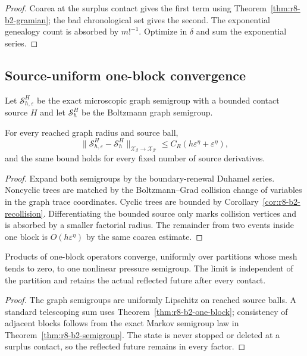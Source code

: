 \begin{proof}
Coarea at the surplus contact gives the first term using
Theorem~\ref{thm:r8-b2-gramian}; the bad chronological set gives the second.
The exponential genealogy count is absorbed by $m!^{-1}$.  Optimize in
$\delta$ and sum the exponential series.
\end{proof}

\subsection{Source-uniform one-block convergence}

Let $\mathcal S_{h,\varepsilon}^H$ be the exact microscopic graph semigroup with
a bounded contact source $H$ and let $\mathcal S_h^H$ be the Boltzmann graph
semigroup.

\begin{theorem}
\label{thm:r8-b2-one-block}
For every reached graph radius and source ball,
\[
 \|\mathcal S_{h,\varepsilon}^H-\mathcal S_h^H\|_{\mathcal X_\beta\to
 \mathcal X_{\beta'}}
 \le C_R(h\varepsilon^\eta+\varepsilon^\eta),
\]
and the same bound holds for every fixed number of source derivatives.
\end{theorem}

\begin{proof}
Expand both semigroups by the boundary-renewal Duhamel series.  Noncyclic trees
are matched by the Boltzmann--Grad collision change of variables in the graph
trace coordinates.  Cyclic trees are bounded by
Corollary~\ref{cor:r8-b2-recollision}.  Differentiating the bounded source only
marks collision vertices and is absorbed by a smaller factorial radius.  The
remainder from two events inside one block is $O(h\varepsilon^\eta)$ by the
same coarea estimate.
\end{proof}

\begin{theorem}
\label{thm:r8-b2-sewing}
Products of one-block operators converge, uniformly over partitions whose mesh
tends to zero, to one nonlinear pressure semigroup.  The limit is independent
of the partition and retains the actual reflected future after every contact.
\end{theorem}

\begin{proof}
The graph semigroups are uniformly Lipschitz on reached source balls.  A
standard telescoping sum uses
Theorem~\ref{thm:r8-b2-one-block}; consistency of adjacent blocks follows from
the exact Markov semigroup law in
Theorem~\ref{thm:r8-b2-semigroup}.  The state is never stopped or deleted at a
surplus contact, so the reflected future remains in every factor.
\end{proof}

